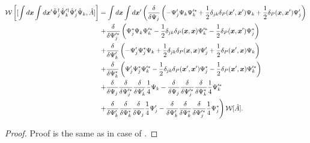 \begin{theorem}
\label{thm:formalism:transformations:w-commutator2}
\begin{equation*}
\begin{split}
	\mathcal{W} \left[
		[
			\int d\boldsymbol{x} \int d\boldsymbol{x}^\prime
			\hat{\Psi}_j^\dagger \hat{\Psi}_k^{\prime\dagger} \hat{\Psi}_j^\prime \hat{\Psi}_k,
			\hat{A}
		]
	\right]
	& = \int d\boldsymbol{x} \int d\boldsymbol{x}^\prime \left(
		\frac{\delta}{\delta \Psi_j} \left(
			- \Psi_j^\prime \Psi_k \Psi_k^{\prime*}
			+ \frac{1}{2} \delta_{jk} \delta_P(\boldsymbol{x}^\prime, \boldsymbol{x}^\prime) \Psi_k
			+ \frac{1}{2} \delta_P(\boldsymbol{x}, \boldsymbol{x}^\prime) \Psi_j^\prime
		\right) \right . \\
	&	\left. + \frac{\delta}{\delta \Psi_j^{\prime*}} \left(
			\Psi_j^* \Psi_k \Psi_k^{\prime*}
			- \frac{1}{2} \delta_{jk} \delta_P(\boldsymbol{x}, \boldsymbol{x}) \Psi_k^{\prime*}
			- \frac{1}{2} \delta_P(\boldsymbol{x}, \boldsymbol{x}^\prime) \Psi_j^*
		\right) \right. \\
	&	\left. + \frac{\delta}{\delta \Psi_k^\prime} \left(
			- \Psi_j^\prime \Psi_j^* \Psi_k
			+ \frac{1}{2} \delta_{jk} \delta_P(\boldsymbol{x}, \boldsymbol{x}) \Psi_j^\prime
			+ \frac{1}{2} \delta_P(\boldsymbol{x}^\prime, \boldsymbol{x}) \Psi_k
		\right) \right .\\
	&	\left. + \frac{\delta}{\delta \Psi_k^*} \left(
			\Psi_j^\prime \Psi_j^* \Psi_k^{\prime*}
			- \frac{1}{2} \delta_{jk} \delta_P(\boldsymbol{x}^\prime, \boldsymbol{x}^\prime) \Psi_j^*
			- \frac{1}{2} \delta_P(\boldsymbol{x}^\prime, \boldsymbol{x}) \Psi_k^{\prime*}
		\right) \right. \\
	&	\left.
			+ \frac{\delta}{\delta \Psi_j}
			\frac{\delta}{\delta \Psi_j^{\prime*}}
			\frac{\delta}{\delta \Psi_k^\prime}
			\frac{1}{4} \Psi_k
			- \frac{\delta}{\delta \Psi_j}
			\frac{\delta}{\delta \Psi_j^{\prime*}}
			\frac{\delta}{\delta \Psi_k^*}
			\frac{1}{4} \Psi_k^{\prime*}
		\right. \\
	&	\left.
			+ \frac{\delta}{\delta \Psi_k^\prime}
			\frac{\delta}{\delta \Psi_k^*}
			\frac{\delta}{\delta \Psi_j}
			\frac{1}{4} \Psi_j^\prime
			- \frac{\delta}{\delta \Psi_k^\prime}
			\frac{\delta}{\delta \Psi_k^*}
			\frac{\delta}{\delta \Psi_j^{\prime*}}
			\frac{1}{4} \Psi_j^*
	\right) \mathcal{W}[\hat{A}].
\end{split}
\end{equation*}
\end{theorem}
\begin{proof}
Proof is the same as in case of .
\end{proof}

